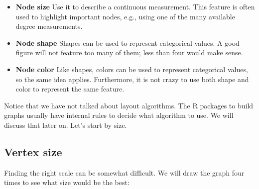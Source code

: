 \documentclass[
]{book}
\begin{document}
\begin{itemize}
\item
  \textbf{Node size} Use it to describe a continuous measurement. This feature is often
  used to highlight important nodes, e.g., using one of the many available degree measurements.
\item
  \textbf{Node shape} Shapes can be used to represent categorical values. A good figure
  will not feature too many of them; less than four would make sense.
\item
  \textbf{Node color} Like shapes, colors can be used to represent categorical values, so the
  same idea applies. Furthermore, it is not crazy to use both shape and color to
  represent the same feature.
\end{itemize}

Notice that we have not talked about layout algorithms. The R packages to build
graphs usually have internal rules to decide what algorithm to use. We will discuss that
later on. Let's start by size.

\hypertarget{vertex-size}{%
\subsection{Vertex size}\label{vertex-size}}

Finding the right scale can be somewhat difficult. We
will draw the graph four times to see what size would be the best:
\end{document}
